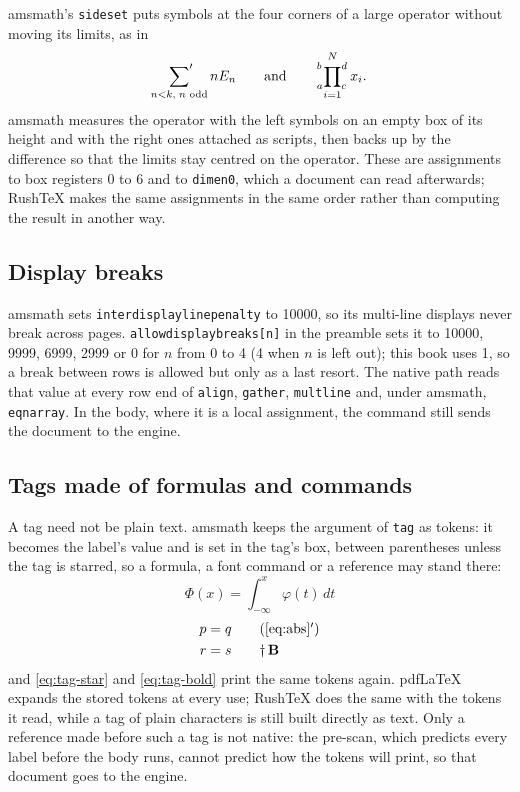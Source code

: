 \documentclass{article}
\numberwithin{equation}{section}
\theoremstyle{definition}
\theoremstyle{remark}
\begin{document}
amsmath's \texttt{sideset} puts symbols at the four corners of a large operator without
moving its limits, as in
\[
  \sideset{}{'}\sum_{n<k,\; n \text{ odd}} n E_n
  \qquad\text{and}\qquad
  \sideset{_a^b}{_c^d}\prod_{i=1}^{N} x_i .
\]
amsmath measures the operator with the left symbols on an empty box of its height and
with the right ones attached as scripts, then backs up by the difference so that the
limits stay centred on the operator. These are assignments to box registers 0 to 6 and
to \texttt{dimen0}, which a document can read afterwards; RushTeX makes the same
assignments in the same order rather than computing the result in another way.

\subsection{Display breaks}
amsmath sets \texttt{interdisplaylinepenalty} to 10000, so its multi-line displays never
break across pages. \texttt{allowdisplaybreaks[n]} in the preamble sets it to 10000, 9999,
6999, 2999 or 0 for $n$ from 0 to 4 (4 when $n$ is left out); this book uses 1, so a
break between rows is allowed but only as a last resort. The native path reads that value
at every row end of \texttt{align}, \texttt{gather}, \texttt{multline} and, under amsmath,
\texttt{eqnarray}. In the body, where it is a local assignment, the command still sends
the document to the engine.

\subsection{Tags made of formulas and commands}
A tag need not be plain text. amsmath keeps the argument of \texttt{tag} as tokens: it
becomes the label's value and is set in the tag's box, between parentheses unless the
tag is starred, so a formula, a font command or a reference may stand there:
\begin{equation}
  \Phi(x) = \int_{-\infty}^{x} \varphi(t)\,dt \tag{$\ast$} \label{eq:tag-star}
\end{equation}
\begin{align}
  p &= q \tag{\ref{eq:abs}$'$} \\
  r &= s \tag*{$\dagger$\,\textbf{B}} \label{eq:tag-bold}
\end{align}
and \eqref{eq:tag-star} and \ref{eq:tag-bold} print the same tokens again. pdfLaTeX
expands the stored tokens at every use; RushTeX does the same with the tokens it read,
while a tag of plain characters is still built directly as text. Only a reference made
before such a tag is not native: the pre-scan, which predicts every label before the
body runs, cannot predict how the tokens will print, so that document goes to the engine.
\end{document}

